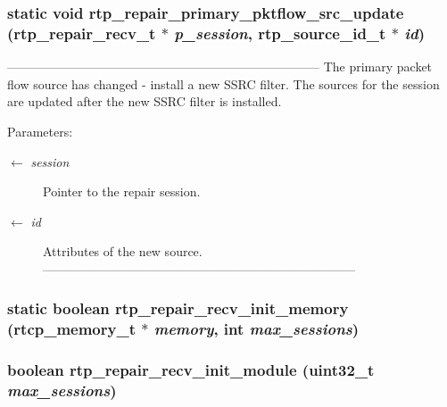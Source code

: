 \subsubsection{\setlength{\rightskip}{0pt plus 5cm}static void rtp\_\-repair\_\-primary\_\-pktflow\_\-src\_\-update (\bf{rtp\_\-repair\_\-recv\_\-t} $\ast$ {\em p\_\-session}, rtp\_\-source\_\-id\_\-t $\ast$ {\em id})\hspace{0.3cm}{\tt  [static]}}\label{rtp__repair__recv_8c_e8c2df32fe23d244e96b2c53878414f8}


--------------------------------------------------------------------------- The primary packet flow source has changed - install a new SSRC filter. The sources for the session are updated after the new SSRC filter is installed.

\begin{Desc}
\item[Parameters:]
\begin{description}
\item[\mbox{$\leftarrow$} {\em session}]Pointer to the repair session. \item[\mbox{$\leftarrow$} {\em id}]Attributes of the new source. --------------------------------------------------------------------------- \end{description}
\end{Desc}
\subsubsection{\setlength{\rightskip}{0pt plus 5cm}static boolean rtp\_\-repair\_\-recv\_\-init\_\-memory (rtcp\_\-memory\_\-t $\ast$ {\em memory}, int {\em max\_\-sessions})\hspace{0.3cm}{\tt  [static]}}\label{rtp__repair__recv_8c_8e922bf841466612d9f981bcfd25e740}


\subsubsection{\setlength{\rightskip}{0pt plus 5cm}boolean rtp\_\-repair\_\-recv\_\-init\_\-module (uint32\_\-t {\em max\_\-sessions})}\label{rtp__repair__recv_8c_341a71fb87c931353f51e2a1d85c05fc}


